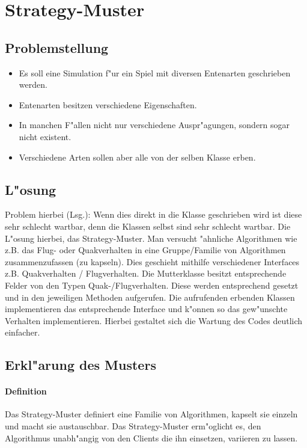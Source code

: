 \section{Strategy-Muster}

\subsection{Problemstellung}
\begin{itemize}
\item Es soll eine Simulation f"ur ein Spiel mit diversen Entenarten geschrieben werden.
\item Entenarten besitzen verschiedene Eigenschaften.
\item In manchen F"allen nicht nur verschiedene Auspr"agungen, sondern sogar nicht existent. 
\item Verschiedene Arten sollen aber alle von der selben Klasse erben. 
\end{itemize}

\subsection{L"osung}
Problem hierbei (Lsg.): 
Wenn  dies direkt in die Klasse geschrieben  wird ist diese sehr schlecht wartbar,  denn die Klassen selbst 
sind  sehr  schlecht wartbar. Die  L"osung  hierbei,  das  Strategy-Muster.  Man versucht  "ahnliche
Algorithmen wie z.B. das Flug- oder Quakverhalten in eine Gruppe/Familie von Algorithmen 
zusammenzufassen (zu kapseln). Dies geschieht mithilfe verschiedener Interfaces z.B. 
Quakverhalten  /  Flugverhalten.  Die  Mutterklasse  besitzt  entsprechende  Felder  von  den  Typen
Quak-/Flugverhalten.  Diese werden entsprechend gesetzt  und in  den jeweiligen Methoden aufgerufen.
Die  aufrufenden erbenden  Klassen implementieren  das  entsprechende  Interface und  k"onnen so das
gew"unschte Verhalten  implementieren.  Hierbei  gestaltet  sich  die  Wartung  des  Codes  deutlich
einfacher.

\subsection{Erkl"arung des Musters}
\paragraph{Definition}
Das  Strategy-Muster definiert  eine  Familie von Algorithmen,  kapselt  sie  einzeln  und macht sie
austauschbar. Das Strategy-Muster  erm"oglicht  es, den  Algorithmus unabh"angig  von den Clients die
ihn einsetzen, variieren zu lassen.

